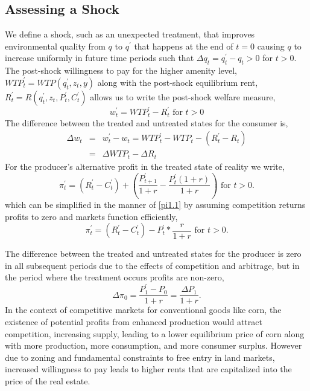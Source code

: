 \documentclass[ecta,nameyear,draft]{econsocart}
\theoremstyle{plain}
\theoremstyle{remark}
\begin{document}
\subsection{Assessing a Shock}
We define a shock, such as an unexpected treatment, that improves environmental quality from $q$ to $q^\prime$ that happens at the end of $t=0$ causing $q$ to increase uniformly in future time periods such that $\Delta q_t=q^\prime_t-q_t>0$ for $t>0$.
The post-shock willingness to pay for the higher amenity level,$\mathit{WTP}^\prime_t=\mathit{WTP}(q^\prime_t,z_t,y)$ along with the post-shock equilibrium rent, $R^\prime_t=R(q^\prime_t,z_t,P^\prime_t,C^\prime_t)$ allows us to write the post-shock welfare measure,
\begin{equation*}
	w^\prime_t=\mathit{WTP}^\prime_t-R^\prime_t \text{ for } t>0
\end{equation*}
The difference between the treated and untreated states for the consumer is,
\begin{eqnarray*}
	\Delta w_t&=&w^\prime_t-w_t=\mathit{WTP}^\prime_t-\mathit{WTP}_t-(R^\prime_t-R_t)\\
	&=&\Delta\mathit{WTP}_t-\Delta R_t
\end{eqnarray*}
For the producer’s alternative profit in the treated state of reality we write,
\begin{equation*}
	\pi^\prime_t = (R^\prime_t-C^\prime_t)+\left(\frac{P^\prime_{t+1}}{1+r}-\frac{P^\prime_t(1+r)}{1+r}\right)\text{ for } t>0.
\end{equation*}
which can be simplified in the manner of \ref{pi1.1} by assuming competition returns profits to zero and markets function efficiently,
\begin{equation*}
\pi^\prime_t = (R^\prime_t-C^\prime_t)-P^\prime_t*\frac{r}{1+r}\text{ for } t>0.\label{pi2}
\end{equation*}

The difference between the treated and untreated states for the producer is zero in all subsequent periods due to the effects of competition and arbitrage, but in the period where the treatment occurs profits are non-zero,
\begin{equation}
	\Delta\pi_0=\frac{P^\prime_1-P_0}{1+r}=\frac{\Delta P_1}{1+r}.\label{pitzero}
\end{equation}
In the context of competitive markets for conventional goods like corn, the existence of potential profits from enhanced production would attract competition, increasing supply, leading to a lower equilibrium price of corn along with more production, more consumption, and more consumer surplus. However due to zoning and fundamental constraints to free entry in land markets, increased willingness to pay leads to higher rents that are capitalized into the price of the real estate. 
\end{document}
